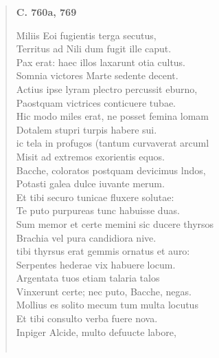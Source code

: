 \documentclass[11pt, a4paper]{report}
\begin{document}
\begin{verse}
     \marginpar{[238]} \begin{center} \textbf{C. 760a, 769} \end{center}Miliis Eoi fugientis terga secutus, \\ Territus ad Nili dum fugit ille caput. \\ Pax erat: haec illos laxarunt otia cultus. \\ Somnia victores Marte sedente decent. \\ Actius ipse lyram plectro percussit eburno, \\ Paostquam victrices conticuere tubae. \\ Hic modo miles erat, ne posset femina lomam \\ Dotalem stupri turpis habere sui. \\ ic tela in profugos (tantum curvaverat arcuml \\ Misit ad extremos exorientis equos. \\ Bacche, coloratos postquam devicimus lndos, \\ Potasti galea dulce iuvante merum. \\ Et tibi securo tunicae fluxere solutae: \\ Te puto purpureas tunc habuisse duas. \\ Sum memor et certe memini sic ducere thyrsos \\ Brachia vel pura candidiora nive. \\ tibi thyrsus erat gemmis ornatus et auro: \\ Serpentes hederae vix habuere locum. \\ Argentata tuos etiam talaria talos \\ Vinxerunt certe; nec puto, Bacche, negas. \\ Mollius es solito mecum tum multa locutus \\ Et tibi consulto verba fuere nova. \\ Inpiger Alcide, multo defuucte labore, \\ 
        ﻿\pagebreak 

\end{verse}
\end{document}

